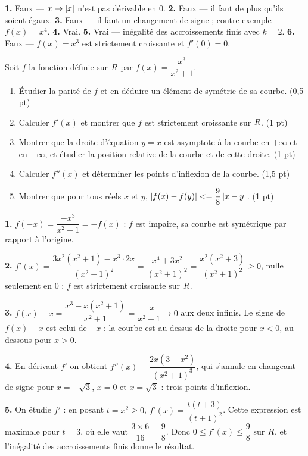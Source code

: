 \begin{corrige}[je me teste]
\textbf{1.} Faux — $x \mapsto \left|x\right|$ n'est pas dérivable en $0$.
\textbf{2.} Faux — il faut de plus qu'ils soient égaux.
\textbf{3.} Faux — il faut un changement de signe ; contre-exemple
$f(x) = x^{4}$.
\textbf{4.} Vrai.
\textbf{5.} Vrai — inégalité des accroissements finis avec $k = 2$.
\textbf{6.} Faux — $f(x) = x^{3}$ est strictement croissante et $f'(0) = 0$.
\end{corrige}

\begin{commeaubac}
Soit $f$ la fonction définie sur $R$ par $f(x) = \dfrac{x^{3}}{x^{2}+1}$.

\begin{enumerate}[label=\textbf{\arabic*.}, leftmargin=*, itemsep=0.25em]
  \item Étudier la parité de $f$ et en déduire un élément de symétrie de sa
        courbe. \hfill\textup{(0,5 pt)}
  \item Calculer $f'(x)$ et montrer que $f$ est strictement croissante
        sur $R$. \hfill\textup{(1 pt)}
  \item Montrer que la droite d'équation $y = x$ est asymptote à la courbe en
        $+\infty$ et en $-\infty$, et étudier la position relative de la
        courbe et de cette droite. \hfill\textup{(1 pt)}
  \item Calculer $f''(x)$ et déterminer les points d'inflexion de la courbe.
        \hfill\textup{(1,5 pt)}
  \item Montrer que pour tous réels $x$ et $y$,
        $\left|f(x)-f(y)\right| <= \dfrac{9}{8}\left|x-y\right|$.
        \hfill\textup{(1 pt)}
\end{enumerate}
\end{commeaubac}

\begin{corrige}
\textbf{1.} $f(-x) = \dfrac{-x^{3}}{x^{2}+1} = -f(x)$ : $f$ est impaire, sa
courbe est symétrique par rapport à l'origine.

\textbf{2.} $f'(x) = \dfrac{3x^{2}(x^{2}+1) - x^{3}\cdot 2x}{(x^{2}+1)^{2}}
= \dfrac{x^{4}+3x^{2}}{(x^{2}+1)^{2}} = \dfrac{x^{2}(x^{2}+3)}{(x^{2}+1)^{2}} \geq 0$,
nulle seulement en $0$ : $f$ est strictement croissante sur $R$.

\textbf{3.} $f(x) - x = \dfrac{x^{3}-x(x^{2}+1)}{x^{2}+1} = \dfrac{-x}{x^{2}+1} \to 0$
aux deux infinis. Le signe de $f(x)-x$ est celui de $-x$ : la courbe est
au-dessus de la droite pour $x<0$, au-dessous pour $x>0$.

\textbf{4.} En dérivant $f'$ on obtient
$f''(x) = \dfrac{2x(3-x^{2})}{(x^{2}+1)^{3}}$, qui s'annule en changeant de
signe pour $x = -\sqrt{3}$, $x = 0$ et $x = \sqrt{3}$ : trois points
d'inflexion.

\textbf{5.} On étudie $f'$ : en posant $t = x^{2} \geq 0$,
$f'(x) = \dfrac{t(t+3)}{(t+1)^{2}}$. Cette expression est maximale pour $t=3$,
où elle vaut $\dfrac{3 \times 6}{16} = \dfrac{9}{8}$. Donc
$0 \leq f'(x) \leq \dfrac{9}{8}$ sur $R$, et l'inégalité des accroissements
finis donne le résultat.
\end{corrige}

